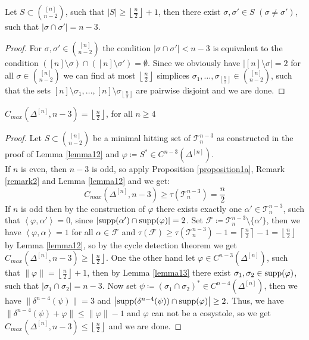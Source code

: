 \begin{lem}\label{lemma13}
Let \(S\subset\binom{[n]}{n-2}\), such that \(\left|S\right|\geq\left\lfloor\frac{n}{2}\right\rfloor+1\), then there exist \(\sigma,\sigma'\in S\) \((\sigma\neq\sigma')\), such that \(\left|\sigma\cap\sigma'\right|=n-3\).
\begin{proof}
For \(\sigma,\sigma'\in\binom{[n]}{n-2}\) the condition \(\left|\sigma\cap\sigma'\right|<n-3\) is equivalent to the condition \(([n]\setminus\sigma)\cap([n]\setminus\sigma')=\emptyset\). Since we obviously have \(\left|[n]\setminus\sigma\right|=2\) for all \(\sigma\in\binom{[n]}{n-2}\) we can find at most \(\left\lfloor\frac{n}{2}\right\rfloor\) simplices \(\sigma_1,\ldots,\sigma_{\left\lfloor\frac{n}{2}\right\rfloor}\in\binom{[n]}{n-2}\), such that the sets \([n]\setminus\sigma_1,\ldots,[n]\setminus\sigma_{\left\lfloor\frac{n}{2}\right\rfloor}\) are pairwise disjoint and we are done.
\end{proof}
\end{lem}

\begin{thm}
\(C_{max}(\Delta^{[n]},n-3)=\left\lfloor\frac{n}{2}\right\rfloor\), for all \(n\geq 4\)
\begin{proof}
Let \(S\subset\binom{[n]}{n-2}\) be a minimal hitting set of \(\mathcal{T}_n^{n-3}\) as constructed in the proof of Lemma \ref{lemma12} and \(\varphi\coloneqq S^*\in C^{n-3}(\Delta^{[n]})\).\\
If \(n\) is even, then \(n-3\) is odd, so apply Proposition \ref{proposition1a}, Remark \ref{remark2} and Lemma \ref{lemma12} and we get:
\[
C_{max}(\Delta^{[n]},n-3)\geq\tau(\mathcal{T}_n^{n-3})=\frac{n}{2}
\]
If \(n\) is odd then by the construction of \(\varphi\) there exists exactly one \(\alpha'\in\mathcal{T}_n^{n-3}\), such that \(\left\langle\varphi,\alpha'\right\rangle=0\), since \(\left|\mathrm{supp}(\alpha')\cap \mathrm{supp}(\varphi)\right|=2\). Set \(\mathcal{F}\coloneqq \mathcal{T}_n^{n-3}\setminus\{\alpha'\}\), then we have \(\left\langle\varphi,\alpha\right\rangle=1\) for all \(\alpha\in\mathcal{F}\) and \(\tau(\mathcal{F})\geq\tau(\mathcal{T}_n^{n-3})-1=\left\lceil\frac{n}{2}\right\rceil-1=\left\lfloor\frac{n}{2}\right\rfloor\) by Lemma \ref{lemma12}, so by the cycle detection theorem we get \(C_{max}(\Delta^{[n]},n-3)\geq\left\lfloor\frac{n}{2}\right\rfloor\). One the other hand let \(\varphi\in C^{n-3}(\Delta^{[n]})\), such that \(\|\varphi\|=\left\lfloor\frac{n}{2}\right\rfloor+1\), then by Lemma \ref{lemma13} there exist \(\sigma_1,\sigma_2\in \mathrm{supp}(\varphi)\), such that \(\left|\sigma_1\cap\sigma_2\right|=n-3\). Now set \(\psi\coloneqq (\sigma_1\cap\sigma_2)^*\in C^{n-4}(\Delta^{[n]})\), then we have \(\|\delta^{n-4}(\psi)\|=3\) and \(\left|\mathrm{supp}(\delta^{n-4}(\psi))\cap \mathrm{supp}(\varphi)\right|\geq 2\). Thus, we have \(\|\delta^{n-4}(\psi)+\varphi\|\leq\|\varphi\|-1\) and \(\varphi\) can not be a cosystole, so we get \(C_{max}(\Delta^{[n]},n-3)\leq\left\lfloor\frac{n}{2}\right\rfloor\) and we are done.
\end{proof}
\end{thm}


